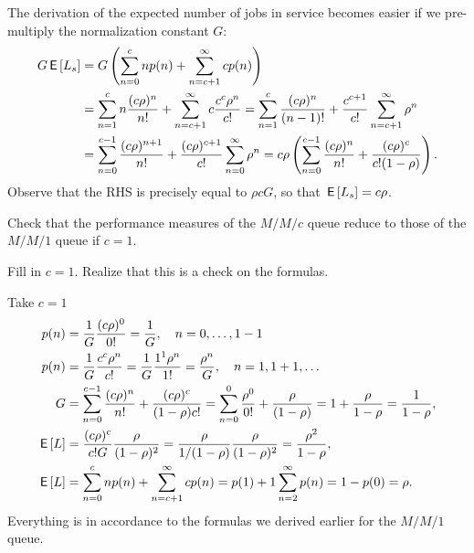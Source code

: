 \begin{exercise}
\begin{solution}
The derivation of the expected number of jobs in service becomes easier if we pre-multiply the normalization constant $G$:
 \begin{align*}
 G \,\mathsf{E}\left[L_s\right]
&= G \left( \sum_{n=0}^{c} n p(n) + \sum_{n=c+1}^{\infty} c p(n) \right) \\
&= \sum_{n=1}^{c} n \frac{(c\rho)^n}{n!} + \sum_{n=c+1}^{\infty} c \frac{c^c\rho^n}{c!} 
= \sum_{n=1}^{c} \frac{(c\rho)^n}{(n-1)!} + \frac{c^{c+1}}{c!}\sum_{n=c+1}^{\infty} \rho^n\\
&= \sum_{n=0}^{c-1} \frac{(c\rho)^{n+1}}{n!} + \frac{(c\rho)^{c+1}}{c!}\sum_{n=0}^{\infty} \rho^n
= c\rho \left(\sum_{n=0}^{c-1} \frac{(c\rho)^n}{n!} + \frac{(c\rho)^{c}}{c!(1-\rho)}\right).
 \end{align*}
Observe that the RHS is precisely equal to $\rho c G$, so that $\,\mathsf{E}\left[L_s\right] = c \rho$.
\end{solution}
\end{exercise}


\begin{exercise}
 Check that the performance measures of the $M/M/c$ queue reduce to those of the $M/M/1$ queue if $c=1$.
\begin{hint}
Fill in $c=1$. Realize that this is a check on the formulas.
\end{hint}
\begin{solution}
Take $c=1$
 \begin{align*}
p(n) &= \frac{1}G \frac{(c\rho)^0}{0!}=\frac1 G, \quad n=0,\ldots, 1-1 \\
p(n) &= \frac{1}G \frac{c^c\rho^n}{c!} = \frac{1}G \frac{1^1\rho^n}{1!} =\frac{\rho^n}G , \quad n=1,1+1, \ldots \\
G &=\sum_{n=0}^{c-1} \frac{(c\rho)^n}{n!} + \frac{(c\rho)^c}{(1-\rho)c!}
=\sum_{n=0}^{0} \frac{\rho^0}{0!} + \frac{\rho}{(1-\rho)} = 1 + \frac{\rho}{1-\rho} = \frac1{1-\rho},
\\
\,\mathsf{E}\left[L\right] &= \frac{(c\rho)^c}{c! G}\frac{\rho}{(1-\rho)^2} = \frac{\rho}{1/(1-\rho)}\frac{\rho}{(1-\rho)^2} = \frac{\rho^2}{1-\rho}, \\
\,\mathsf{E}\left[L\right] &= \sum_{n=0}^{c}n p(n) + \sum_{n=c+1}^\infty c p(n) = p(1) + 1 \sum_{n=2}^\infty p(n) = 1- p(0) = \rho.
\end{align*}
Everything is in accordance to the formulas we derived earlier for the $M/M/1$ queue. 
\end{solution}
\end{exercise}



